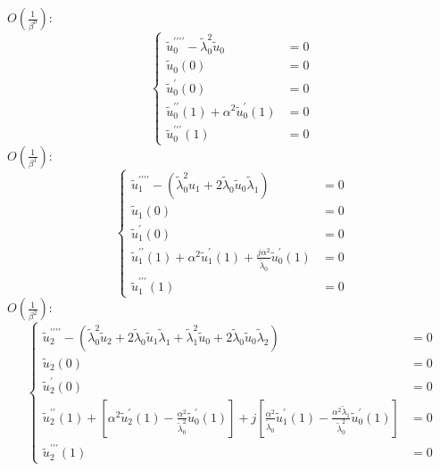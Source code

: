 \documentclass{article}
\begin{document}
\noindent
$O(\frac{1}{\beta^0})$:
\begin{equation}
    \left\{\begin{aligned}
        \tilde{u}_0^{\prime\prime\prime\prime} - \tilde\lambda_0^2 \tilde{u}_0 &=0 \\
        \tilde{u}_0(0) &= 0 \\
        \tilde{u}^{\prime}_0(0) &= 0 \\
        \tilde{u}^{\prime\prime}_0(1) + \alpha^2 \tilde{u}^{\prime}_0(1) &= 0 \\
        \tilde{u}^{\prime\prime\prime}_0(1) &= 0 
    \end{aligned}\right.
\end{equation}
$O(\frac{1}{\beta^1})$:
\begin{equation}
    \left\{\begin{aligned}
        \tilde{u}_1^{\prime\prime\prime\prime} - \left( \tilde\lambda_0^2 u_1 + 2 \tilde\lambda_0 \tilde{u}_0 \tilde\lambda_1 \right) &=0 \\
        \tilde{u}_1(0) &= 0 \\
        \tilde{u}^{\prime}_1(0) &= 0 \\
        \tilde{u}^{\prime\prime}_1(1) + \alpha^2 \tilde{u}_1^{\prime}(1) + \frac{j \alpha^2}{\tilde\lambda_0} \tilde{u}_0^{\prime}(1) &= 0 \\
        \tilde{u}^{\prime\prime\prime}_1(1) &= 0 
    \end{aligned}\right.
\end{equation}
$O(\frac{1}{\beta^2})$:
\begin{equation}
    \left\{\begin{aligned}
        \tilde{u}_2^{\prime\prime\prime\prime} - \left( \tilde\lambda_0^2 \tilde{u}_2 + 2 \tilde\lambda_0 \tilde{u}_1 \tilde\lambda_1 + \tilde\lambda_1^2 \tilde{u}_0 + 2 \tilde\lambda_0 \tilde{u}_0 \tilde\lambda_2 \right) &=0 \\
        \tilde{u}_2(0) &= 0 \\
        \tilde{u}^{\prime}_2(0) &= 0 \\
        \tilde{u}^{\prime\prime}_2(1) + \left[ \alpha^2 \tilde{u}_2^{\prime}(1) - \frac{\alpha^2}{\tilde\lambda_0^2} \tilde{u}_0^{\prime}(1) \right] + j \left[ \frac{\alpha^2}{\tilde\lambda_0} \tilde{u}_1^{\prime}(1) - \frac{\alpha^2 \tilde\lambda_1}{\tilde\lambda_0^2} \tilde{u}_0^{\prime}(1) \right] &= 0 \\
        \tilde{u}^{\prime\prime\prime}_2(1) &= 0 
    \end{aligned}\right.
\end{equation}
\end{document}
